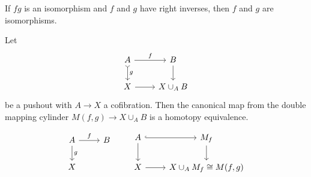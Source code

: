 \documentclass{article}
\begin{document}
\begin{exercise}
	If $fg$ is an isomorphism and $f$ and $g$ have right inverses, then $f$ and $g$ are isomorphisms.
\end{exercise}

\begin{lemma}
	Let
	\[\begin{tikzcd}
		A\arrow[d,"g",tail]\arrow[r,"f"]&B\arrow[d]\\
		X\arrow[r]&X\cup_AB
	\end{tikzcd}\]
	be a pushout with $A\to X$ a cofibration. Then the canonical map from the double mapping cylinder $M(f,g)\to X\cup_AB$ is a homotopy equivalence.
\end{lemma}
\begin{remark}
	\[\begin{tikzcd}
		A\arrow[d,"g"]\arrow[r,"f"]&B\\
		X
	\end{tikzcd}\qquad \begin{tikzcd}
		A\arrow[d]\arrow[r,hook]&M_f\arrow[d]\\
		X\arrow[r]&X\cup_AM_f\cong M(f,g)
	\end{tikzcd}\]
\end{remark}
\end{document}
